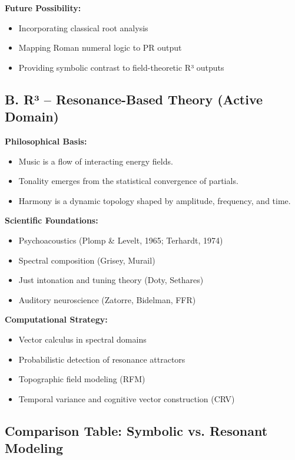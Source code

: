 \documentclass{article}
\begin{document}
\textbf{Future Possibility:}

\begin{itemize}
    \item Incorporating classical root analysis
    \item Mapping Roman numeral logic to PR output
    \item Providing symbolic contrast to field-theoretic R³ outputs
\end{itemize}

\subsection*{B. R³ – Resonance-Based Theory (Active Domain)}

\textbf{Philosophical Basis:}
\begin{itemize}
    \item Music is a flow of interacting energy fields.
    \item Tonality emerges from the statistical convergence of partials.
    \item Harmony is a dynamic topology shaped by amplitude, frequency, and time.
\end{itemize}

\textbf{Scientific Foundations:}
\begin{itemize}
    \item Psychoacoustics (Plomp \& Levelt, 1965; Terhardt, 1974)
    \item Spectral composition (Grisey, Murail)
    \item Just intonation and tuning theory (Doty, Sethares)
    \item Auditory neuroscience (Zatorre, Bidelman, FFR)
\end{itemize}

\textbf{Computational Strategy:}
\begin{itemize}
    \item Vector calculus in spectral domains
    \item Probabilistic detection of resonance attractors
    \item Topographic field modeling (RFM)
    \item Temporal variance and cognitive vector construction (CRV)
\end{itemize}

\subsection*{Comparison Table: Symbolic vs. Resonant Modeling}
\end{document}
